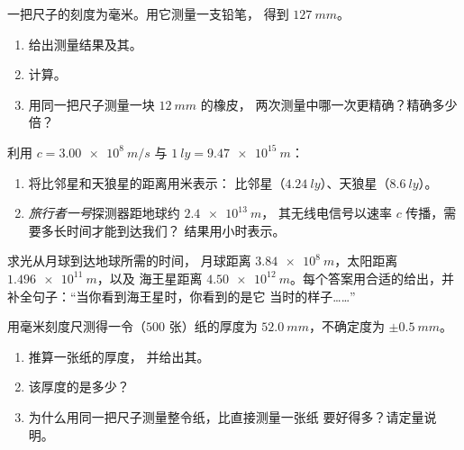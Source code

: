 \begin{exercise}[$\star$]\label{exo:g10:orders-of-magnitude:5}
一把尺子的刻度为毫米。用它测量一支铅笔，
得到 $\qty{127}{mm}$。
\begin{enumerate}
  \item 给出测量结果及其。
  \item 计算。
  \item 用同一把尺子测量一块 $\qty{12}{mm}$ 的橡皮，
        两次测量中哪一次更精确？精确多少倍？
\end{enumerate}
\end{exercise}

\begin{exercise}[$\star\star$]\label{exo:g10:orders-of-magnitude:6}
利用 $c = \qty{3.00e8}{m/s}$ 与 $\qty{1}{ly} = \qty{9.47e15}{m}$：
\begin{enumerate}
  \item 将比邻星和天狼星的距离用米表示：
        比邻星（$\qty{4.24}{ly}$）、天狼星（$\qty{8.6}{ly}$）。
  \item \emph{旅行者一号}探测器距地球约 $\qty{2.4e13}{m}$，
        其无线电信号以速率 $c$ 传播，需要多长时间才能到达我们？
        结果用小时表示。
\end{enumerate}
\end{exercise}

\begin{exercise}[$\star\star$]\label{exo:g10:orders-of-magnitude:7}
求光从月球到达地球所需的时间，
月球距离 $\qty{3.84e8}{m}$，太阳距离 $\qty{1.496e11}{m}$，以及
海王星距离 $\qty{4.50e12}{m}$。每个答案用合适的给出，并
补全句子：“当你看到海王星时，你看到的是它
当时的样子……”
\end{exercise}

\begin{exercise}[$\star\star$]\label{exo:g10:orders-of-magnitude:8}
用毫米刻度尺测得一令（$500$ 张）纸的厚度为
$\qty{52.0}{mm}$，不确定度为 $\pm\qty{0.5}{mm}$。
\begin{enumerate}
  \item 推算一张纸的厚度，
        并给出其。
  \item 该厚度的是多少？
  \item 为什么用同一把尺子测量整令纸，比直接测量一张纸
        要好得多？请定量说明。
\end{enumerate}
\end{exercise}


